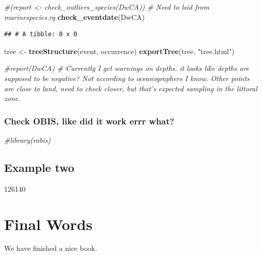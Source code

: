 \documentclass[]{book}
\newenvironment{Shaded}{\begin{snugshade}}{\end{snugshade}}
\newcommand{\CommentTok}[1]{\textcolor[rgb]{0.56,0.35,0.01}{\textit{#1}}}
\newcommand{\KeywordTok}[1]{\textcolor[rgb]{0.13,0.29,0.53}{\textbf{#1}}}
\newcommand{\NormalTok}[1]{#1}
\newcommand{\StringTok}[1]{\textcolor[rgb]{0.31,0.60,0.02}{#1}}
\begin{document}
\begin{Shaded}
\begin{Highlighting}[]
\CommentTok{#(report <- check_outliers_species(DwCA)) # Need to lsid from marinespecies.rg}
\KeywordTok{check_eventdate}\NormalTok{(DwCA)}
\end{Highlighting}
\end{Shaded}

\begin{verbatim}
## # A tibble: 0 x 0
\end{verbatim}

\begin{Shaded}
\begin{Highlighting}[]
\NormalTok{tree <-}\StringTok{ }\KeywordTok{treeStructure}\NormalTok{(event, occurrence)}
\KeywordTok{exportTree}\NormalTok{(tree, }\StringTok{"tree.html"}\NormalTok{)}

\CommentTok{#report(DwCA) # Currently I get warnings on depths. it looks like depths are supposed to be negative? Not according to oceanographers I know. Other points are close to land, need to check closer, but that's expected sampling in the littoral zone.}
\end{Highlighting}
\end{Shaded}

\hypertarget{check-obis-like-did-it-work-errr-what}{%
\subsection{Check OBIS, like did it work errr what?}\label{check-obis-like-did-it-work-errr-what}}

\begin{Shaded}
\begin{Highlighting}[]
\CommentTok{#library(robis)}
\end{Highlighting}
\end{Shaded}

\hypertarget{example-two}{%
\section{Example two}\label{example-two}}

126140

\hypertarget{final-words}{%
\chapter{Final Words}\label{final-words}}

We have finished a nice book.


\end{document}
